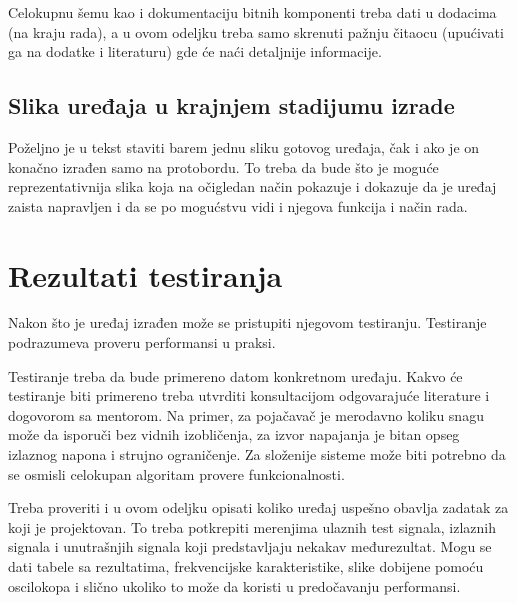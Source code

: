 \documentclass[a4paper, 12pt]{article}
\begin{document}
\vspace{10pt}

Celokupnu šemu kao i dokumentaciju bitnih komponenti treba dati u dodacima (na kraju rada), a u ovom odeljku treba samo skrenuti pažnju čitaocu (upućivati ga na dodatke i literaturu) gde će naći detaljnije informacije.

\vspace{10pt}

	\subsection{Slika uređaja u krajnjem stadijumu izrade}

\vspace{10pt}

Poželjno je u tekst staviti barem jednu sliku gotovog uređaja, čak i ako je on konačno izrađen samo na protobordu. To treba da bude što je moguće reprezentativnija slika koja na očigledan način pokazuje i dokazuje da je uređaj zaista napravljen i da se po mogućstvu vidi i njegova funkcija i način rada.

\pagebreak

\section{Rezultati testiranja}

\vspace{10pt}

Nakon što je uređaj izrađen može se pristupiti njegovom testiranju. Testiranje podrazumeva proveru performansi u praksi.

\vspace{10pt}

Testiranje treba da bude primereno datom konkretnom uređaju. Kakvo će testiranje biti primereno treba utvrditi konsultacijom odgovarajuće literature i dogovorom sa mentorom. Na primer, za pojačavač je merodavno koliku snagu može da isporuči bez vidnih izobličenja, za izvor napajanja je bitan opseg izlaznog napona i strujno ograničenje. Za složenije sisteme može biti potrebno da se osmisli celokupan algoritam provere funkcionalnosti.

\vspace{10pt}

Treba proveriti i u ovom odeljku opisati koliko uređaj uspešno obavlja zadatak za koji je projektovan. To treba potkrepiti merenjima ulaznih test signala, izlaznih signala i unutrašnjih signala koji predstavljaju nekakav međurezultat. Mogu se dati tabele sa rezultatima, frekvencijske karakteristike, slike dobijene pomoću oscilokopa i slično ukoliko to može da koristi u predočavanju performansi.
\pagebreak
\end{document}
